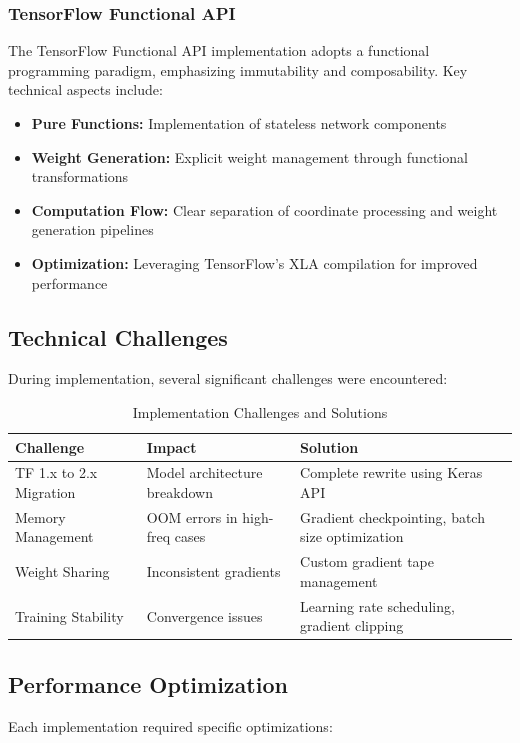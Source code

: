 \documentclass[10pt,journal,compsoc]{IEEEtran}
\begin{document}
\subsubsection{TensorFlow Functional API}
The TensorFlow Functional API implementation adopts a functional programming paradigm, emphasizing immutability and composability. Key technical aspects include:

\begin{itemize}
    \item \textbf{Pure Functions:} Implementation of stateless network components
    \item \textbf{Weight Generation:} Explicit weight management through functional transformations
    \item \textbf{Computation Flow:} Clear separation of coordinate processing and weight generation pipelines
    \item \textbf{Optimization:} Leveraging TensorFlow's XLA compilation for improved performance
\end{itemize}

\subsection{Technical Challenges}
During implementation, several significant challenges were encountered:

\begin{table}[t]
    \caption{Implementation Challenges and Solutions}
    \label{tab:challenges}
    \centering
    \begin{tabular}{|p{2.5cm}|p{2.5cm}|p{2.5cm}|}
        \hline
        \textbf{Challenge} & \textbf{Impact} & \textbf{Solution} \\
        \hline
        TF 1.x to 2.x Migration & Model architecture breakdown & Complete rewrite using Keras API \\
        \hline
        Memory Management & OOM errors in high-freq cases & Gradient checkpointing, batch size optimization \\
        \hline
        Weight Sharing & Inconsistent gradients & Custom gradient tape management \\
        \hline
        Training Stability & Convergence issues & Learning rate scheduling, gradient clipping \\
        \hline
    \end{tabular}
\end{table}

\subsection{Performance Optimization}
Each implementation required specific optimizations:
\end{document}
